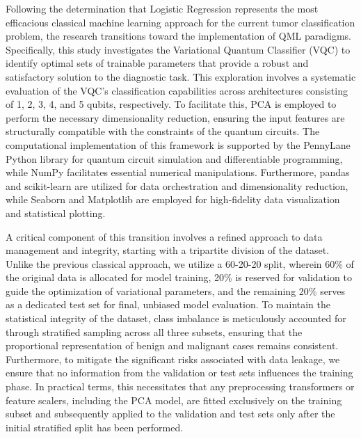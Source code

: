 \documentclass[en]{dimscthesis}
\begin{document}
Following the determination that Logistic Regression represents the most efficacious classical machine learning approach for the current tumor classification problem, the research transitions toward the implementation of QML paradigms. Specifically, this study investigates the Variational Quantum Classifier (VQC) to identify optimal sets of trainable parameters that provide a robust and satisfactory solution to the diagnostic task. This exploration involves a systematic evaluation of the VQC's classification capabilities across architectures consisting of 1, 2, 3, 4, and 5 qubits, respectively. To facilitate this, PCA is employed to perform the necessary dimensionality reduction, ensuring the input features are structurally compatible with the constraints of the quantum circuits. The computational implementation of this framework is supported by the PennyLane \cite{bib:pennylane} Python library for quantum circuit simulation and differentiable programming, while NumPy \cite{bib:numpy} facilitates essential numerical manipulations. Furthermore, pandas and scikit-learn are utilized for data orchestration and dimensionality reduction, while Seaborn \cite{bib:seaborn} and Matplotlib \cite{bib:matplotlib} are employed for high-fidelity data visualization and statistical plotting.

A critical component of this transition involves a refined approach to data management and integrity, starting with a tripartite division of the dataset. Unlike the previous classical approach, we utilize a 60-20-20 split, wherein 60\% of the original data is allocated for model training, 20\% is reserved for validation to guide the optimization of variational parameters, and the remaining 20\% serves as a dedicated test set for final, unbiased model evaluation. To maintain the statistical integrity of the dataset, class imbalance is meticulously accounted for through stratified sampling across all three subsets, ensuring that the proportional representation of benign and malignant cases remains consistent. Furthermore, to mitigate the significant risks associated with data leakage, we ensure that no information from the validation or test sets influences the training phase. In practical terms, this necessitates that any preprocessing transformers or feature scalers, including the PCA model, are fitted exclusively on the training subset and subsequently applied to the validation and test sets only after the initial stratified split has been performed.
\end{document}
